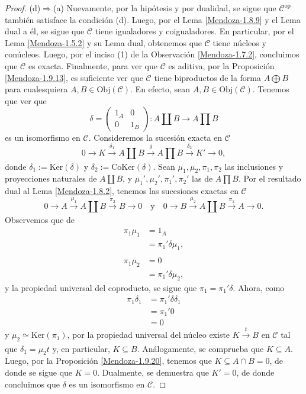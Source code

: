 \documentclass[tesis]{subfiles}
\begin{document}
\begin{proof}
    (d)$\Rightarrow$(a) Nuevamente, por la hipótesis y por dualidad, se sigue que $\mathscr{C}^\text{op}$ también satisface la condición (d). Luego, por el Lema \ref{Mendoza-1.8.9} y el Lema dual a él, se sigue que $\mathscr{C}$ tiene igualadores y coigualadores. En particular, por el Lema \ref{Mendoza-1.5.2} y su Lema dual, obtenemos que $\mathscr{C}$ tiene núcleos y conúcleos. Luego, por el inciso (1) de la Observación \ref{Mendoza-1.7.2}, concluimos que $\mathscr{C}$ es exacta. Finalmente, para ver que $\mathscr{C}$ es aditiva, por la Proposición \ref{Mendoza-1.9.13}, es suficiente ver que $\mathscr{C}$ tiene biproductos de la forma $A\bigoplus B$ para cualesquiera $A,B\in\text{Obj}(\mathscr{C})$. En efecto, sean $A,B\in\text{Obj}(\mathscr{C})$. Tenemos que ver que
    \[
        \delta = \begin{pmatrix} 1_A &0 \\ 0 &1_B \end{pmatrix}:A\coprod B\to A\prod B
    \] 
    es un isomorfismo en $\mathscr{C}$. Consideremos la sucesión exacta en $\mathscr{C}$
    \[
    0\to K\xrightarrow[]{\delta_1} A\coprod B\xrightarrow[]{\delta} A\prod B\xrightarrow[]{\delta_2} K'\to 0,
    \] 
    donde $\delta_1:= \text{Ker}(\delta)$ y $\delta_2:= \text{CoKer}(\delta)$. Sean $\mu_1, \mu_2, \pi_1, \pi_2$ las inclusiones y proyecciones naturales de $A\coprod B$, y $\mu_1',\mu_2',\pi_1',\pi_2'$ las de $A\prod B$. Por el resultado dual al Lema \ref{Mendoza-1.8.2}, tenemos las sucesiones exactas en $\mathscr{C}$
    \[
        0\to A\xrightarrow[]{\mu_1} A\coprod B\xrightarrow[]{\pi_2} B\to 0 \quad \text{y} \quad 0\to B\xrightarrow[]{\mu_2} A\coprod B\xrightarrow[]{\pi_1} A\to 0.
    \] 
    Observemos que de
    \begin{align*}
        \pi_1\mu_1 &= 1_A \\
                   &= \pi_1'\delta\mu_1, \\ \\
        \pi_1\mu_2 &= 0 \\
                   &= \pi_1'\delta\mu_2,
    \end{align*}
    y la propiedad universal del coproducto, se sigue que $\pi_1 = \pi_1'\delta$. Ahora, como
    \begin{align*}
        \pi_1\delta_1 &= \pi_1'\delta\delta_1 \\
                      &= \pi_1'0 \\
                      &= 0
    \end{align*}
    y $\mu_2\simeq\text{Ker}(\pi_1)$, por la propiedad universal del núcleo existe $K\xrightarrow[]{t}B$ en $\mathscr{C}$ tal que $\delta_1 = \mu_2t$ y, en particular, $K\subseteq B$. Análogamente, se comprueba que $K\subseteq A$. Luego, por la Proposición \ref{Mendoza-1.9.20}, tenemos que $K\subseteq A\cap B=0$, de donde se sigue que $K=0$. Dualmente, se demuestra que $K'=0$, de donde concluimos que $\delta$ es un isomorfismo en $\mathscr{C}$.
\end{proof}
\end{document}
